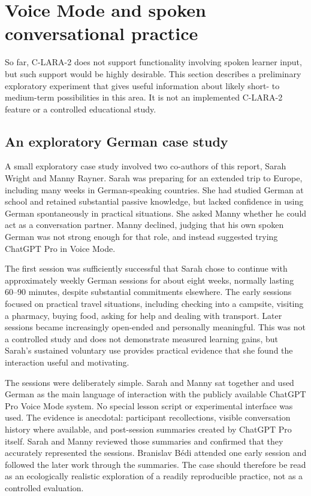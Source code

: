 \section{Voice Mode and spoken conversational practice}

So far, C-LARA-2 does not support functionality involving spoken learner input,
but such support would be highly desirable. This section describes a
preliminary exploratory experiment that gives useful information about likely
short- to medium-term possibilities in this area. It is not an implemented
C-LARA-2 feature or a controlled educational study.

\subsection{An exploratory German case study}

A small exploratory case study involved two co-authors of this report, Sarah
Wright and Manny Rayner. Sarah was preparing for an extended trip to Europe,
including many weeks in German-speaking countries. She had studied German at
school and retained substantial passive knowledge, but lacked confidence in
using German spontaneously in practical situations. She asked Manny whether he
could act as a conversation partner. Manny declined, judging that his own
spoken German was not strong enough for that role, and instead suggested trying
ChatGPT Pro in Voice Mode.

The first session was sufficiently successful that Sarah chose to continue
with approximately weekly German sessions for about eight weeks, normally
lasting 60--90 minutes, despite substantial commitments elsewhere. The early
sessions focused on practical travel situations, including checking into a
campsite, visiting a pharmacy, buying food, asking for help and dealing with
transport. Later sessions became increasingly open-ended and personally
meaningful. This was not a controlled study and does not demonstrate measured
learning gains, but Sarah's sustained voluntary use provides practical evidence
that she found the interaction useful and motivating.

The sessions were deliberately simple. Sarah and Manny sat together and used
German as the main language of interaction with the publicly available
ChatGPT Pro Voice Mode system. No special lesson script or experimental
interface was used. The evidence is anecdotal: participant recollections,
visible conversation history where available, and post-session summaries
created by ChatGPT Pro itself. Sarah and Manny reviewed those summaries and
confirmed that they accurately represented the sessions. Branislav Bédi
attended one early session and followed the later work through the summaries.
The case should therefore be read as an ecologically realistic exploration of
a readily reproducible practice, not as a controlled evaluation.

